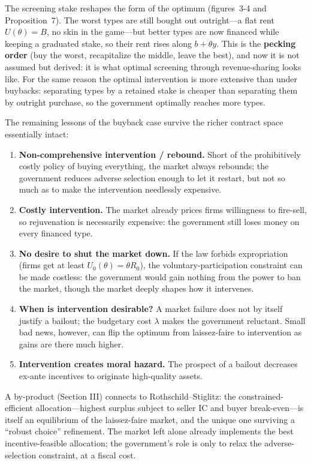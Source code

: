 \documentclass[11pt]{article}
\theoremstyle{definition}
\theoremstyle{plain}
\begin{document}
The screening stake reshapes the form of the optimum (figures~3-4 and Proposition~7). The worst
types are still bought out outright---a flat rent $U(\theta)=B$, no skin in the
game---but better types are now financed while keeping a graduated stake, so
their rent rises along $b+\theta y$. This is the \textbf{pecking order} (buy the
worst, recapitalize the middle, leave the best), and now it is not assumed but
derived: it is what optimal screening through revenue-sharing looks like.
For the same reason the optimal intervention is more extensive than under
buybacks: separating types by a retained stake is cheaper than separating them
by outright purchase, so the government optimally reaches more types.

The remaining lessons of the buyback
case survive the richer contract space essentially intact:
\begin{enumerate}[label=(\roman*),leftmargin=2.2em]
  \item \textbf{Non-comprehensive intervention / rebound.} Short of the
  prohibitively costly policy of buying everything, the market always rebounds;
  the government reduces adverse selection enough to let it restart, but not so
  much as to make the intervention needlessly expensive.
  \item \textbf{Costly intervention.} The market already prices firms
  willingness to fire-sell, so rejuvenation is necessarily expensive: the
  government still loses money on every financed type.
  \item \textbf{No desire to shut the market down.} If the law forbids
  expropriation (firms get at least $U_0(\theta)=\theta R_0$), the
  voluntary-participation constraint can be made costless: the government would
  gain nothing from the power to ban the market, though the market deeply shapes
  how it intervenes.
  \item \textbf{When is intervention desirable?} A market failure does not by
  itself justify a bailout; the budgetary cost $\lambda$ makes the government
  reluctant. Small bad news, however, can flip the optimum from laissez-faire to
  intervention as gains are there much higher.
  \item \textbf{Intervention creates moral hazard.} The prospect of a bailout
  decreases ex-ante incentives to originate high-quality assets.
\end{enumerate}

A by-product (Section III) connects to Rothschild--Stiglitz: the
constrained-efficient allocation---highest surplus subject to seller IC and
buyer break-even---is itself an equilibrium of the laissez-faire market, and the
unique one surviving a ``robust choice'' refinement. The market left alone
already implements the best incentive-feasible allocation; the government's role
is only to relax the adverse-selection constraint, at a fiscal cost.
\end{document}
